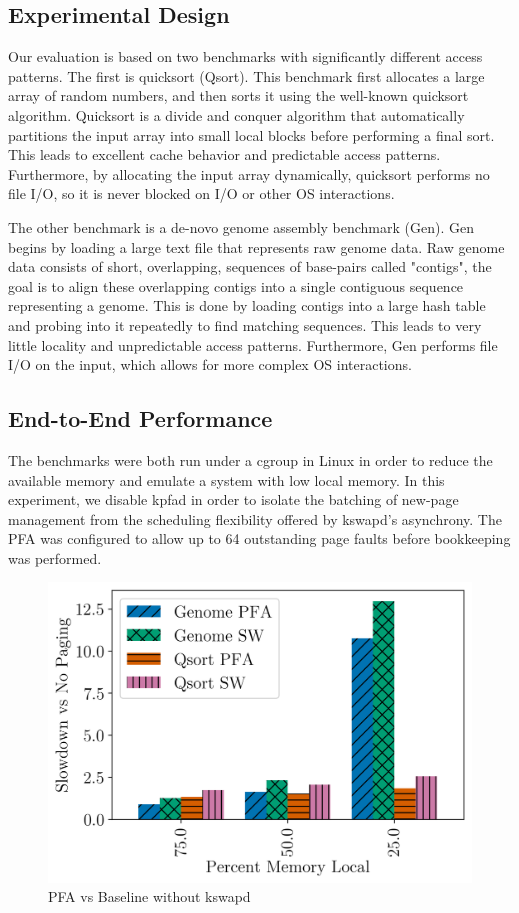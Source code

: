 \subsection{Experimental Design} \label{sec:expDesign}
  Our evaluation is based on two benchmarks with significantly different access
  patterns. The first is quicksort (Qsort). This benchmark first allocates a
  large array of random numbers, and then sorts it using the well-known
  quicksort algorithm.  Quicksort is a divide and conquer algorithm that
  automatically partitions the input array into small local blocks before
  performing a final sort. This leads to excellent cache behavior and
  predictable access patterns.  Furthermore, by allocating the input array
  dynamically, quicksort performs no file I/O, so it is never blocked on I/O or
  other OS interactions.

  The other benchmark is a de-novo genome assembly benchmark (Gen). Gen begins
  by loading a large text file that represents raw genome data. Raw genome data
  consists of short, overlapping, sequences of base-pairs called "contigs", the
  goal is to align these overlapping contigs into a single contiguous sequence
  representing a genome. This is done by loading contigs into a large hash
  table and probing into it repeatedly to find matching sequences. This leads
  to very little locality and unpredictable access patterns. Furthermore, Gen
  performs file I/O on the input, which allows for more complex OS
  interactions.

\subsection{End-to-End Performance} \label{sec:fullPerf}
  The benchmarks were both run under a cgroup in Linux in order to reduce the
  available memory and emulate a system with low local memory. In this
  experiment, we disable kpfad in order to isolate the batching of new-page
  management from the scheduling flexibility offered by kswapd's asynchrony.
  The PFA was configured to allow up to 64 outstanding page faults before
  bookkeeping was performed.

  \begin{figure}[h] \centering
    \includegraphics[width=0.6\columnwidth]{figs/perf_nokswapd.png}
    \vspace{-5mm}
    \caption{PFA vs Baseline without kswapd}
    \label{fig:pfa_perf}
  \end{figure}
  \FloatBarrier

